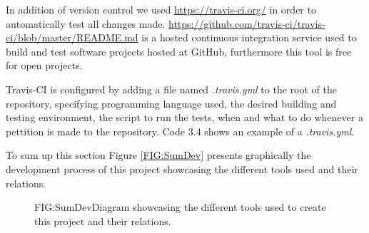 In addition of version control we used \href{Travis-CI}{https://travis-ci.org/} in order to automatically test all changes made. \href{Travis CI}{https://github.com/travis-ci/travis-ci/blob/master/README.md} is a hosted continuous integration service used to build and test software projects hosted at GitHub, furthermore this tool is free for open projects.

Travis-CI is configured by adding a file named \textit{.travis.yml} to the root of the repository, specifying programming language used, the desired building and testing environment, the script to run the tests, when and what to do whenever a pettition is made to the repository. Code 3.4 shows an example of a \textit{.travis.yml}.

\label{CODE:TRAVIS}


To sum up this section Figure \ref{FIG:SumDev} presents graphically the development process of this project showcasing the different tools used and their relations.

\begin{figure}[Summary of the development process]{FIG:SumDev}{Diagram showcasing the different tools used to create this project and their relations.}
\end{figure}